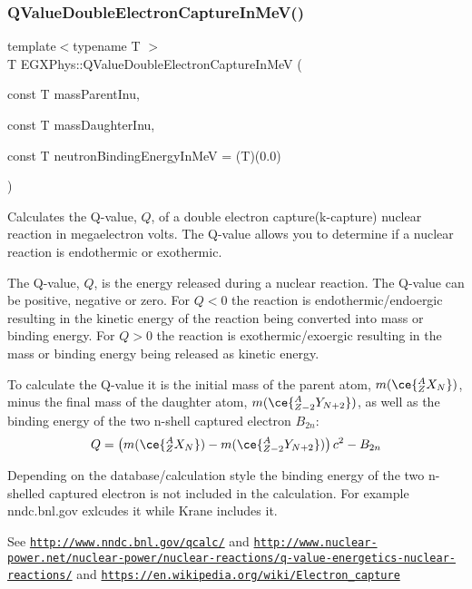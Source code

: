 \subsubsection{\texorpdfstring{Q\+Value\+Double\+Electron\+Capture\+In\+Me\+V()}{QValueDoubleElectronCaptureInMeV()}}
{\footnotesize\ttfamily template$<$typename T $>$ \\
T E\+G\+X\+Phys\+::\+Q\+Value\+Double\+Electron\+Capture\+In\+MeV (\begin{DoxyParamCaption}\item[{const T}]{mass\+Parent\+Inu,  }\item[{const T}]{mass\+Daughter\+Inu,  }\item[{const T}]{neutron\+Binding\+Energy\+In\+MeV = {\ttfamily (T)(0.0)} }\end{DoxyParamCaption})}



Calculates the Q-\/value, $Q$, of a double electron capture(k-\/capture) nuclear reaction in megaelectron volts. The Q-\/value allows you to determine if a nuclear reaction is endothermic or exothermic. 

The Q-\/value, $Q$, is the energy released during a nuclear reaction. The Q-\/value can be positive, negative or zero. For $Q < 0$ the reaction is endothermic/endoergic resulting in the kinetic energy of the reaction being converted into mass or binding energy. For $Q > 0$ the reaction is exothermic/exoergic resulting in the mass or binding energy being released as kinetic energy.

To calculate the Q-\/value it is the initial mass of the parent atom, $m(\ce{ ^{A}_{Z}X_{N} })$, minus the final mass of the daughter atom, $m(\ce{ ^{A}_{Z -2}Y_{N +2} })$, as well as the binding energy of the two n-\/shell captured electron $B_{2n}$\+: \[Q = \left ( m(\ce{ ^{A}_{Z}X_{N} })-m(\ce{ ^{A}_{Z -2}Y_{N +2} }) \right) c^2-B_{2n}\]

Depending on the database/calculation style the binding energy of the two n-\/shelled captured electron is not included in the calculation. For example nndc.\+bnl.\+gov exlcudes it while Krane includes it.

See \href{http://www.nndc.bnl.gov/qcalc/}{\tt http\+://www.\+nndc.\+bnl.\+gov/qcalc/} and \href{http://www.nuclear-power.net/nuclear-power/nuclear-reactions/q-value-energetics-nuclear-reactions/}{\tt http\+://www.\+nuclear-\/power.\+net/nuclear-\/power/nuclear-\/reactions/q-\/value-\/energetics-\/nuclear-\/reactions/} and \href{https://en.wikipedia.org/wiki/Electron_capture}{\tt https\+://en.\+wikipedia.\+org/wiki/\+Electron\+\_\+capture}

